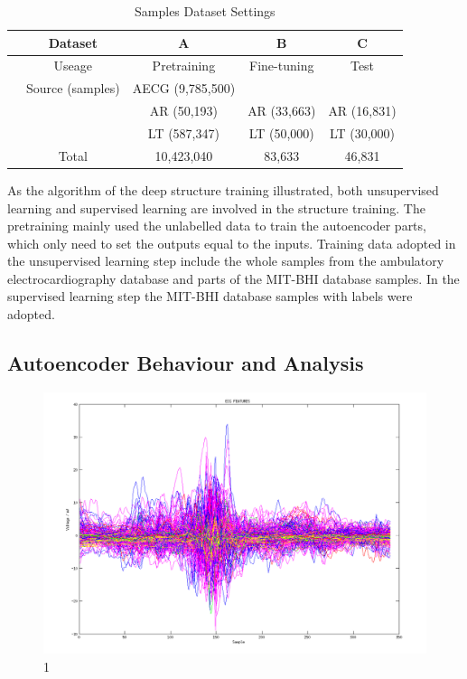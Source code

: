 \documentclass[journal]{IEEEtran}
\begin{document}
     
\begin{table}[!htbp]
\begin{center}
\begin{threeparttable}
\caption{Samples Dataset Settings}
\label{table3}
\begin{tabular}{ccccc}
\hline
& Dataset & A & B  &  C\\
\hline
& Useage  & Pretraining & Fine-tuning & Test \\
\hline
& Source (samples) & AECG (9,785,500)   &  &   \\
&  & AR (50,193)   & AR (33,663) & AR (16,831) \\
&  & LT (587,347)  & LT (50,000) & LT (30,000) \\
\hline
&Total & 10,423,040 & 83,633 & 46,831 \\
\hline
\end{tabular}
\end{threeparttable}
\end{center}
\end{table}

As the algorithm of the deep structure training illustrated, both unsupervised learning and supervised learning are involved in the structure training. The pretraining mainly used the unlabelled data to train the autoencoder parts, which only need to set the outputs equal to the inputs. Training data adopted in the unsupervised learning step include the whole samples from the  ambulatory electrocardiography database and parts of the MIT-BHI database samples. In the supervised learning step the MIT-BHI database samples with labels were adopted.




\subsection{Autoencoder Behaviour and Analysis}


\begin{figure}[]
\centering
\includegraphics[width=3.5 in]{eps/features.png}
\caption{1}
\label{figure5}
\end{figure}
\end{document}
